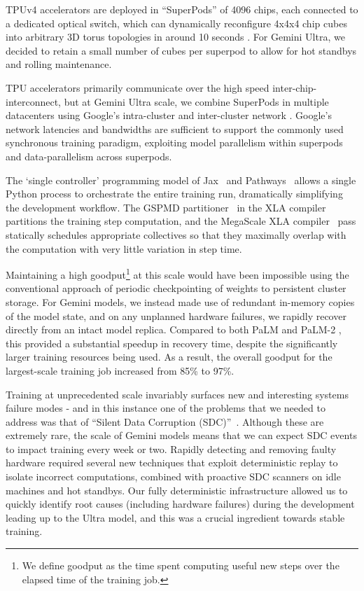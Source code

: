 TPUv4 accelerators are deployed in ``SuperPods'' of 4096 chips, each connected to a dedicated optical switch, which can dynamically reconfigure 4x4x4 chip cubes into arbitrary 3D torus topologies in around 10 seconds \citep{tpuv4}. For Gemini Ultra, we decided to retain a small number of cubes per superpod to allow for hot standbys and rolling maintenance. 

TPU accelerators primarily communicate over the high speed inter-chip-interconnect, but at Gemini Ultra scale, we combine SuperPods in multiple datacenters using Google's intra-cluster and inter-cluster network \cite{jupiter,b4,pony}. Google's network latencies and bandwidths are sufficient to support the commonly used synchronous training paradigm, exploiting model parallelism within superpods and data-parallelism across superpods.

The `single controller' programming model of Jax~\cite{jax} and Pathways~\cite{pathways} allows a single Python process to orchestrate the entire training run, dramatically simplifying the development workflow. The GSPMD partitioner~\cite{gspmd} in the XLA compiler partitions the training step computation, and  the MegaScale XLA compiler~\cite{xla} pass statically schedules appropriate collectives so that they maximally overlap with the computation with very little variation in step time.

Maintaining a high goodput\footnote{We define goodput as the time spent computing useful new steps over the elapsed time of the training job.} at this scale would have been impossible using the conventional approach of periodic checkpointing of weights to persistent cluster storage. For Gemini models, we instead made use of redundant in-memory copies of the model state, and on any unplanned hardware failures, we rapidly recover directly from an intact model replica. Compared to both PaLM and PaLM-2 \cite{palm2}, this provided a substantial speedup in recovery time, despite the significantly larger training resources being used. As a result, the overall goodput for the largest-scale training job increased from 85\% to 97\%.

Training at unprecedented scale invariably surfaces new and interesting systems failure modes - and in this instance one of the problems that we needed to address was that of ``Silent Data Corruption (SDC)''~\cite{sdcs, sdc2, hochschild2021cores}. Although these are extremely rare, the scale of Gemini models means that we can expect SDC events to impact training every week or two. Rapidly detecting and removing faulty hardware required several new techniques that exploit deterministic replay to isolate incorrect computations, combined with proactive SDC scanners on idle machines and hot standbys. Our fully deterministic infrastructure allowed us to quickly identify root causes (including hardware failures) during the development leading up to the Ultra model, and this was a crucial ingredient towards stable training.

